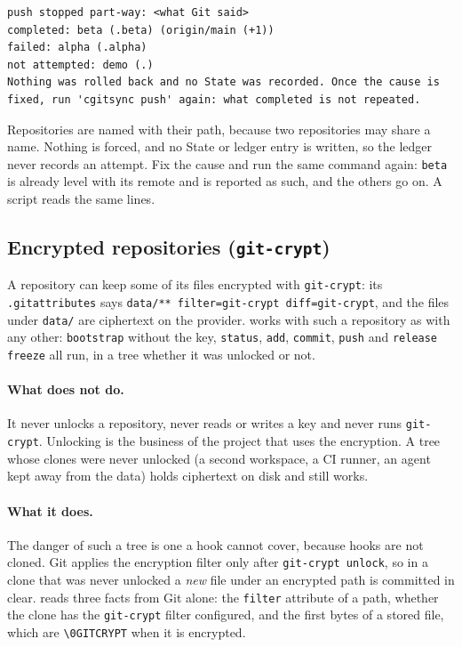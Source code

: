 \begin{lstlisting}
push stopped part-way: <what Git said>
completed: beta (.beta) (origin/main (+1))
failed: alpha (.alpha)
not attempted: demo (.)
Nothing was rolled back and no State was recorded. Once the cause is fixed, run 'cgitsync push' again: what completed is not repeated.
\end{lstlisting}

Repositories are named with their path, because two repositories may share a
name. Nothing is forced, and no State or ledger entry is written, so the
ledger never records an attempt. Fix the cause and run the same command
again: \texttt{beta} is already level with its remote and is reported as
such, and the others go on. A script reads the same lines.

\subsection{Encrypted repositories (\texttt{git-crypt})}\label{sec:encrypted-repos}

A repository can keep some of its files encrypted with \texttt{git-crypt}:
its \texttt{.gitattributes} says \texttt{data/** filter=git-crypt
diff=git-crypt}, and the files under \texttt{data/} are ciphertext on the
provider. \cgspkg{} works with such a repository as with any other:
\texttt{bootstrap} without the key, \texttt{status}, \texttt{add},
\texttt{commit}, \texttt{push} and \texttt{release freeze} all run, in a
tree whether it was unlocked or not.

\paragraph{What \cgspkg{} does not do.} It never unlocks a repository, never
reads or writes a key and never runs \texttt{git-crypt}. Unlocking is the
business of the project that uses the encryption. A tree whose clones were
never unlocked (a second workspace, a CI runner, an agent kept away from the
data) holds ciphertext on disk and still works.

\paragraph{What it does.} The danger of such a tree is one a hook cannot
cover, because hooks are not cloned. Git applies the encryption filter only
after \texttt{git-crypt unlock}, so in a clone that was never unlocked a
\emph{new} file under an encrypted path is committed in clear. \cgspkg{}
reads three facts from Git alone: the \texttt{filter} attribute of a path,
whether the clone has the \texttt{git-crypt} filter configured, and the
first bytes of a stored file, which are \texttt{\textbackslash 0GITCRYPT}
when it is encrypted.

